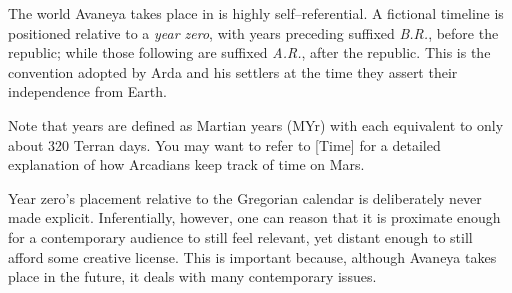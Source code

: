 
The world Avaneya takes place in is highly self--referential. A fictional timeline is positioned relative to a {\it year zero}, with years preceding suffixed {\it B.R.}, before the republic; while those following are suffixed {\it A.R.}, after the republic. This is the convention adopted by Arda and his settlers at the time they assert their independence from Earth.

Note that years are defined as Martian years (MYr) with each equivalent to only about 320 Terran days. You may want to refer to [Time] for a detailed explanation of how Arcadians keep track of time on Mars.

Year zero's placement relative to the Gregorian calendar is deliberately never made explicit. Inferentially, however, one can reason that it is proximate enough for a contemporary audience to still feel relevant, yet distant enough to still afford some creative license. This is important because, although Avaneya takes place in the future, it deals with many contemporary issues.

\startlines
\page 
\page 
\page 
\page 
\page 
\page 
\page 
\page 
\stoplines

\StopChapter

